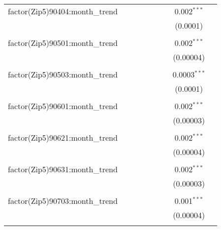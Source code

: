 \begin{table}[H]
{\begin{tabular}{@{\extracolsep{5pt}}lcccccccc}
  factor(Zip5)90404:month\_trend &  &  &  &  &  &  & 0.002$^{***}$ &  \\  

   &  &  &  &  &  &  & (0.0001) &  \\  

   & & & & & & & & \\  

  factor(Zip5)90501:month\_trend &  &  &  &  &  &  & 0.002$^{***}$ &  \\  

   &  &  &  &  &  &  & (0.00004) &  \\  

   & & & & & & & & \\  

  factor(Zip5)90503:month\_trend &  &  &  &  &  &  & 0.0003$^{***}$ &  \\  

   &  &  &  &  &  &  & (0.0001) &  \\  

   & & & & & & & & \\  

  factor(Zip5)90601:month\_trend &  &  &  &  &  &  & 0.002$^{***}$ &  \\  

   &  &  &  &  &  &  & (0.00003) &  \\  

   & & & & & & & & \\  

  factor(Zip5)90621:month\_trend &  &  &  &  &  &  & 0.002$^{***}$ &  \\  

   &  &  &  &  &  &  & (0.00004) &  \\  

   & & & & & & & & \\  

  factor(Zip5)90631:month\_trend &  &  &  &  &  &  & 0.002$^{***}$ &  \\  

   &  &  &  &  &  &  & (0.00003) &  \\  

   & & & & & & & & \\  

  factor(Zip5)90703:month\_trend &  &  &  &  &  &  & 0.001$^{***}$ &  \\  

   &  &  &  &  &  &  & (0.00004) &  \\  

   & & & & & & & & \\  


\end{tabular}}
\end{table}
